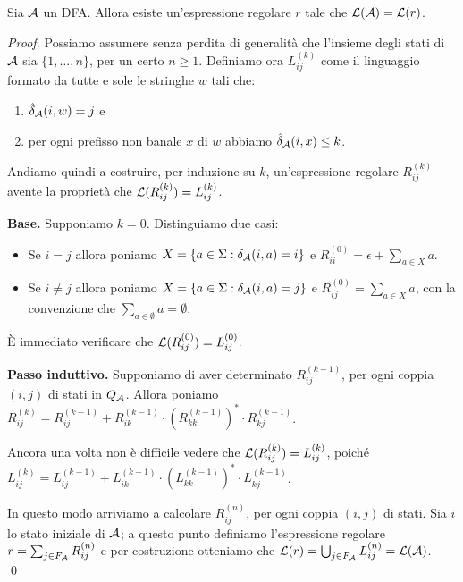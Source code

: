 \documentclass[runningheads,a4paper]{llncs}
\begin{document}
\begin{theorem}\label{thm:NFA-regexp}
Sia $\mathcal{A}$ un DFA. Allora esiste un'espressione regolare $r$ tale che $\mathcal{L}(\mathcal{A}) = \mathcal{L}(r)$.
\end{theorem}

\begin{proof}
Possiamo assumere senza perdita di generalit\`{a} che l'insieme degli stati di $\mathcal{A}$ sia $\{1,\ldots,n\}$, per un certo $n\geq 1$. Definiamo ora $L_{ij}^{(k)}$ come il linguaggio formato da tutte e sole le stringhe $w$ tali che:
\begin{enumerate}[(1)]
\item $\hat{\delta}_{\mathcal{A}}(i,w) = j$ e  
\item per ogni prefisso non banale $x$ di $w$ abbiamo $\hat{\delta}_{\mathcal{A}}(i,x) \leq k$.
\end{enumerate}

Andiamo quindi a costruire, per induzione su $k$, un'espressione regolare $R_{ij}^{(k)}$ avente la propriet\`{a} che $\mathcal{L}(R_{ij}^{(k)}) = L_{ij}^{(k)}$.

\noindent\textbf{Base.} Supponiamo $k=0$. Distinguiamo due casi:
\begin{itemize}
\item Se $i=j$ allora poniamo $X = \{a \in \Sigma : \delta_{\mathcal{A}}(i,a) = i\}$ e $R_{ii}^{(0)} = \epsilon + \sum_{a \in X} a$.
\item Se $i\neq j$ allora poniamo $X = \{a \in \Sigma : \delta_{\mathcal{A}}(i,a) = j\}$ e $R_{ij}^{(0)} = \sum_{a \in X} a$, con la convenzione che $\sum_{a \in \emptyset} a = \emptyset$.
\end{itemize}
\`{E} immediato verificare che $\mathcal{L}(R_{ij}^{(0)}) = L_{ij}^{(0)}$.

\noindent\textbf{Passo induttivo.} Supponiamo di aver determinato $R_{ij}^{(k-1)}$, per ogni coppia $(i,j)$ di stati in $Q_{\mathcal{A}}$. Allora poniamo $R_{ij}^{(k)} = R_{ij}^{(k-1)} + R_{ik}^{(k-1)}\cdot (R_{kk}^{(k-1)})^*\cdot R_{kj}^{(k-1)}$.

Ancora una volta non \`{e} difficile vedere che $\mathcal{L}(R_{ij}^{(k)}) = L_{ij}^{(k)}$, poich\'{e}\\ $L_{ij}^{(k)} = L_{ij}^{(k-1)} + L_{ik}^{(k-1)}\cdot (L_{kk}^{(k-1)})^*\cdot L_{kj}^{(k-1)}$.

In questo modo arriviamo a calcolare $R_{ij}^{(n)}$, per ogni coppia $(i,j)$ di stati. Sia $i$ lo stato iniziale di $\mathcal{A}$; a questo punto definiamo l'espressione regolare\\ $r = \sum_{j \in F_{\mathcal{A}}} R_{ij}^{(n)}$ e per costruzione otteniamo che $\mathcal{L}(r)= \bigcup_{j \in F_{\mathcal{A}}} L_{ij}^{(n)} =\mathcal{L}(\mathcal{A})$.
\qed\end{proof}
\end{document}
